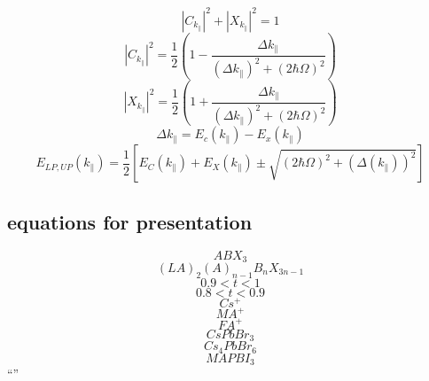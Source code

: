 \documentclass{article}
\begin{document}
\begin{equation*}
    |C_{k_\parallel}|^2 + |X_{k_\parallel}|^2 = 1 
\end{equation*}
\begin{equation*}
    |C_{k_\parallel}|^2=\frac{1}{2}(1-\frac{\Delta k_\parallel}{(\Delta k_\parallel)^2+(2\hbar\Omega)^2})
\end{equation*}
\begin{equation*}
    |X_{k_\parallel}|^2=\frac{1}{2}(1+\frac{\Delta k_\parallel}{(\Delta k_\parallel)^2+(2\hbar\Omega)^2})
\end{equation*}
\begin{equation*}
    \Delta k_\parallel = E_c(k_\parallel) - E_x(k_\parallel)
\end{equation*}
\begin{equation*}
    E_{LP,UP}(k_\parallel)=\frac{1}{2}[E_C(k_\parallel)+E_X(k_\parallel)\pm\sqrt{(2\hbar\Omega)^2+(\Delta(k_\parallel))^2}]
\end{equation*}
\subsection{equations for presentation}
$$ ABX_3 $$
$$ (LA)_2(A)_{n-1}B_n X_{3n-1} $$
$$ 0.9<t<1 $$ 
$$ 0.8<t<0.9 $$
$$ Cs^+ $$
$$ MA^+ $$
$$ FA^+ $$
$$ CsPbBr_3 $$
$$ Cs_4 Pb Br_6 $$
$$ MAPBI_3 $$
``''
\end{document}
